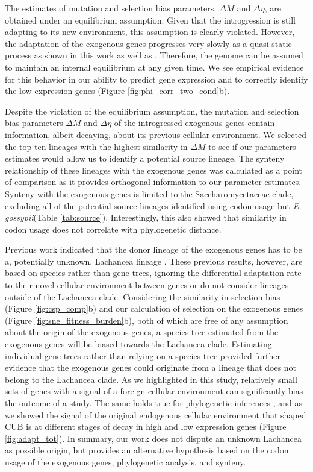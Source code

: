 \documentclass[doublespacing,linenumbers]{bmcart-modified}
\newcommand{\gossypii}{\textit{E. gossypii}\xspace}
\newcommand{\DM}{\ensuremath{{\Delta M}}\xspace}
\newcommand{\DE}{\ensuremath{{\Delta \eta}}\xspace}
\begin{document}
The estimates of mutation and selection bias parameters, \DM and \DE, are obtained under an equilibrium assumption.
Given that the introgression is still adapting to its new environment, this assumption is clearly violated.
However, the adaptation of the exogenous genes progresses very slowly as a quasi-static process as shown in this work as well as \cite{friedrich2015}.
Therefore, the genome can be assumed to maintain an internal equilibrium at any given time. 
We see empirical evidence for this behavior in our ability to predict gene expression and to correctly identify the low expression genes (Figure \ref{fig:phi_corr_two_cond}b). 

Despite the violation of the equilibrium assumption, the mutation and selection bias parameters \DM and \DE of the introgressed exogenous genes contain information, albeit decaying, about its previous cellular environment.
We selected the top ten lineages with the highest similarity in \DM to see if our parameters estimates would allow us to identify a potential source lineage.
The synteny relationship of these lineages with the exogenous genes was calculated as a point of comparison as it provides orthogonal information to our parameter estimates.
Synteny with the exogenous genes is limited to the Saccharomycetaceae clade, excluding all of the potential source lineages identified using codon usage but \gossypii (Table \ref{tab:source}).
Interestingly, this also showed that similarity in codon usage does not correlate with phylogenetic distance.

Previous work indicated that the donor lineage of the exogenous genes has to be a, potentially unknown, Lachancea lineage \citep{payen2009, friedrich2015, vakirlis2016, brion2017}.
These previous results, however, are based on species rather than gene trees, ignoring the differential adaptation rate to their novel cellular environment between genes or do not consider lineages outside of the Lachancea clade.
Considering the similarity in selection bias (Figure \ref{fig:csp_comp}b) and our calculation of selection on the exogenous genes (Figure \ref{fig:sne_fitness_burden}b), both of which are free of any assumption about the origin of the exogenous genes, a species tree estimated from the exogenous genes will be biased towards the Lachancea clade.
Estimating individual gene trees rather than relying on a species tree provided further evidence that the exogenous genes could originate from a lineage that does not belong to the Lachancea clade.
As we highlighted in this study, relatively small sets of genes with a signal of a foreign cellular environment can significantly bias the outcome of a study. 
The same holds true for phylogenetic inferences \citep{salichos2013}, and as we showed the signal of the original endogenous cellular environment that shaped CUB is at different stages of decay in high and low expression genes (Figure \ref{fig:adapt_tot}).
In summary, our work does not dispute an unknown Lachancea as possible origin, but provides an alternative hypothesis based on the codon usage of the exogenous genes, phylogenetic analysis, and synteny.
\end{document}
